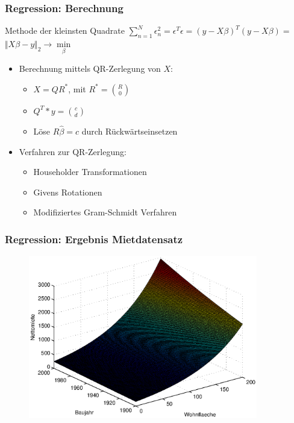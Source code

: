 \documentclass{beamer}
\begin{document}
\begin{frame}
  \frametitle{Regression: Berechnung}

  \begin{block}{Methode der kleinsten Quadrate}
    {\centering
      $\sum\limits^{N}_{n=1} \epsilon^2_n = \epsilon^T \epsilon = (y - X \beta)^T (y - X \beta) = $
      $\Vert X\beta - y \Vert_2 \rightarrow \min\limits_{\beta}$
      \\}
  \end{block}
  
  \begin{itemize}
  \item Berechnung mittels QR-Zerlegung von $X$:
    \begin{itemize}
    \item $X = QR^*$, mit $R^* = \binom{R}{0}$
    \item $Q^T * y = \binom{c}{d}$
    \item Löse $R \hat{\beta} = c$ durch Rückwärtseinsetzen
    \end{itemize}
  \end{itemize}

  \pause

  \begin{itemize}
  \item Verfahren zur QR-Zerlegung:
    \begin{itemize}
    \item Householder Transformationen
    \item Givens Rotationen
    \item Modifiziertes Gram-Schmidt Verfahren
    \end{itemize}
  \end{itemize}

\end{frame}

\begin{frame}
  \frametitle{Regression: Ergebnis Mietdatensatz}
  
  \begin{figure}[t]
    \centering
    \includegraphics[width=10cm]{figures/nm_wfl_bj_log_approach.eps}
  \end{figure}

\end{frame}
\end{document}
